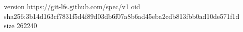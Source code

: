 version https://git-lfs.github.com/spec/v1
oid sha256:3b14d163cf7831f5d4f89d03db6f07a8b6ad45eba2cdb813fbb0ad10de571f1d
size 262240
